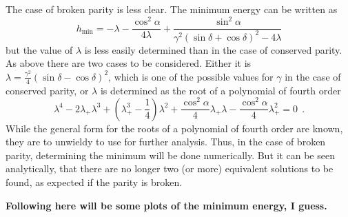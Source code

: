 The case of broken parity is less clear.
The minimum energy can be written as 
\begin{equation}
h_\text{min}  = -\lambda - \frac{\cos^2 \alpha}{4\lambda} + \frac{\sin^2\alpha}{\gamma^2(\sin\delta + \cos\delta)^2 - 4 \lambda}
\end{equation}
but the value of $\lambda$ is less easily determined than in the case of conserved parity.
As above there are two cases to be considered.
Either it is $\lambda=\frac{\gamma^2}{4}\left( \sin \delta - \cos\delta \right)^2$, which is one of the possible values for $\gamma$ in the case of conserved parity,
or $\lambda$ is determined as the root of a polynomial of fourth order
\begin{equation}
\lambda^4 - 2 \lambda_+ \lambda^3 + (\lambda_+^3 -\frac{1}{4})\lambda^2 + \frac{\cos^2 \alpha}{4} \lambda_+ \lambda -\frac{\cos^2\alpha}{4}\lambda_+^2 = 0~~.
\end{equation}
While the general form for the roots of  a polynomial of fourth order are known, they are to unwieldy to use for further analysis. 
Thus, in the case of broken parity, determining the minimum will be done numerically.
But it can be seen analytically, that there are no longer two (or more) equivalent solutions to be found, as expected if the parity is broken.

\textbf{Following here will be some plots of the minimum energy, I guess.}